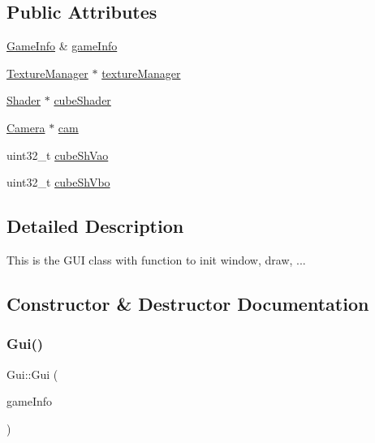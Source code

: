 \subsection*{Public Attributes}
\begin{DoxyCompactItemize}
\item 
\hyperlink{struct_game_info}{Game\+Info} \& \hyperlink{class_gui_af562e2e6f0b773511162d1a5171d7475}{game\+Info}
\item 
\hyperlink{class_texture_manager}{Texture\+Manager} $\ast$ \hyperlink{class_gui_a5d8ee3bce3eda71d2223718ef121660c}{texture\+Manager}
\item 
\hyperlink{class_shader}{Shader} $\ast$ \hyperlink{class_gui_adaa7b6fc050d0e88579dfea30b1d4866}{cube\+Shader}
\item 
\hyperlink{class_camera}{Camera} $\ast$ \hyperlink{class_gui_ad69615330ffddbdb5e74dd9163434af6}{cam}
\item 
uint32\+\_\+t \hyperlink{class_gui_aad8b6babe608aef719ca0180579d0c54}{cube\+Sh\+Vao}
\item 
uint32\+\_\+t \hyperlink{class_gui_ab9f1f53daba063532c91590af6a17bdf}{cube\+Sh\+Vbo}
\end{DoxyCompactItemize}


\subsection{Detailed Description}
This is the G\+UI class with function to init window, draw, ... 

\subsection{Constructor \& Destructor Documentation}
\mbox{\label{class_gui_a470a9b3fdd6f43eb46f11276220013a4}} 
\subsubsection{\texorpdfstring{Gui()}{Gui()}\hspace{0.1cm}{\footnotesize\ttfamily [1/2]}}
{\footnotesize\ttfamily Gui\+::\+Gui (\begin{DoxyParamCaption}\item[{\hyperlink{struct_game_info}{Game\+Info} \&}]{game\+Info }\end{DoxyParamCaption})\hspace{0.3cm}{\ttfamily [explicit]}}



